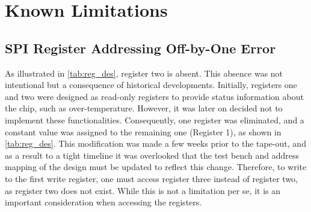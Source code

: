 \section{Known Limitations}
\label{sec:limitations}

\subsection{SPI Register Addressing Off-by-One Error}
As illustrated in \autoref{tab:reg_des}, register two is absent. This absence was not intentional but a consequence of historical developments. Initially, registers one and two were designed as read-only registers to provide status information about the chip, such as over-temperature. However, it was later on decided not to implement these functionalities. Consequently, one register was eliminated, and a constant value was assigned to the remaining one (Register 1), as shown in \autoref{tab:reg_des}.
This modification was made a few weeks prior to the tape-out, and as a result to a tight timeline it was overlooked that the test bench and address mapping of the design must be updated to reflect this change. Therefore, to write to the first write register, one must access register three instead of register two, as register two does not exist. While this is not a limitation per se, it is an important consideration when accessing the registers.

